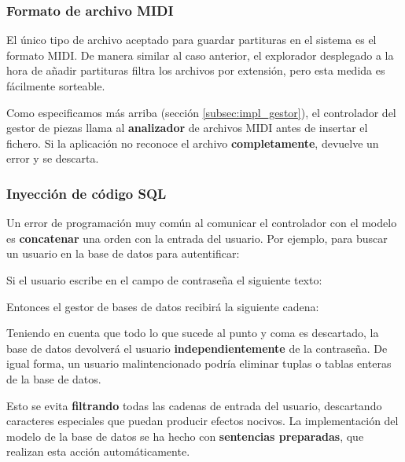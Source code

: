 \subsubsection{Formato de archivo MIDI}

El único tipo de archivo aceptado para guardar partituras en el sistema es el formato \acrshort{MIDI}. De manera similar al caso anterior, el explorador desplegado a la hora de añadir partituras filtra los archivos por extensión, pero esta medida es fácilmente sorteable.

Como especificamos más arriba (sección \ref{subsec:impl_gestor}), el controlador del gestor de piezas llama al \textbf{analizador} de archivos \acrshort{MIDI} antes de insertar el fichero. Si la aplicación no reconoce el archivo \textbf{completamente}, devuelve un error y se descarta.

\subsubsection{Inyección de código SQL}

Un error de programación muy común al comunicar el controlador con el modelo es \textbf{concatenar} una orden con la entrada del usuario. Por ejemplo, para buscar un usuario en la base de datos para autentificar:

\begin{center}
\end{center}

Si el usuario escribe en el campo de contraseña el siguiente texto:

\begin{center}
\end{center}

Entonces el gestor de bases de datos recibirá la siguiente cadena:

\begin{center}
\end{center}

Teniendo en cuenta que todo lo que sucede al punto y coma es descartado, la base de datos devolverá el usuario \textbf{independientemente} de la contraseña. De igual forma, un usuario malintencionado podría eliminar tuplas o tablas enteras de la base de datos.

Esto se evita \textbf{filtrando} todas las cadenas de entrada del usuario, descartando caracteres especiales que puedan producir efectos nocivos. La implementación del modelo de la base de datos se ha hecho con \textbf{sentencias preparadas}, que realizan esta acción automáticamente.

